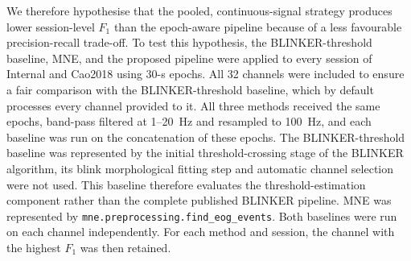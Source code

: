 We therefore hypothesise that the pooled, continuous-signal strategy produces lower session-level $F_1$ than the epoch-aware pipeline because of a less favourable precision-recall trade-off. To test this hypothesis, the BLINKER-threshold baseline, MNE, and the proposed pipeline were applied to every session of Internal and Cao2018 using 30-s epochs. All 32 channels were included to ensure a fair comparison with the BLINKER-threshold baseline, which by default processes every channel provided to it. All three methods received the same epochs, band-pass filtered at 1--20~Hz and resampled to 100~Hz, and each baseline was run on the concatenation of these epochs.
The BLINKER-threshold baseline was represented by the initial threshold-crossing stage of the BLINKER algorithm, its blink morphological fitting step and automatic channel selection were not used. This baseline therefore evaluates the threshold-estimation component rather than the complete published BLINKER pipeline. MNE was represented by \texttt{mne.preprocessing.find\_eog\_events}. Both baselines were run on each channel independently.
For each method and session, the channel with the highest $F_1$ was then retained.